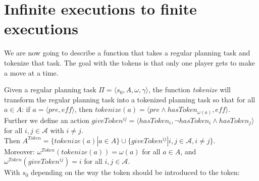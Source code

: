 \section{Infinite executions to finite executions}

We are now going to describe a function that takes a regular planning task and tokenize that task. The goal with the tokens is that only one player gets to make a move at a time.

Given a regular planning task $\Pi = \langle s_0, A, \omega, \gamma \rangle $, the function \textit{tokenize} will transform the regular planning task into a tokenized planning task so that for all $a \in A$:
 if $a = \langle pre, \textit{eff} \rangle$, then
   $tokenize(a) =\langle pre \wedge hasToken_{\omega(a)}, \textit{eff} \rangle$. \\
Further we define an action
    $ giveToken^{ij} = \langle hasToken_i, \neg hasToken_i \wedge hasToken_j \rangle $
    for all $i,j \in \mathcal{A}$ with $i \not = j$. \\
Then $ A^{Token}=\{tokenize(a)|a \in A\} \cup \{giveToken^{ij}|i,j \in \mathcal{A}, i \not = j\}$. \\
Moreover: $\omega^{Token}(tokenize(a))= \omega(a)$ for all $a \in A$,
and $\omega^{Token}(giveToken^{ij}) = i$ for all $i,j \in \mathcal{A}$. \\
With $s_0$ depending on the way the token should be introduced to the token:

